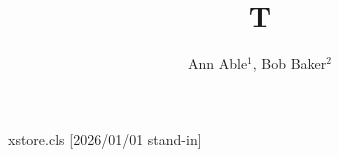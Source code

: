 \begin{filecontents*}[overwrite]{xstore.cls}
[2026/01/01 stand-in]
\RequirePackage{authblk}
\newcommand{\institute}[1]{\def\@institute{#1}}\institute{}
\renewcommand{\maketitle}{\bgroup{\Large\@title\par}{\@author\par}{\@institute\par}\egroup}
\end{filecontents*}
\documentclass{xstore}

\title{T}
\author{Ann Able$^{1}$, Bob Baker$^{2}$}
\maketitle
Text.

